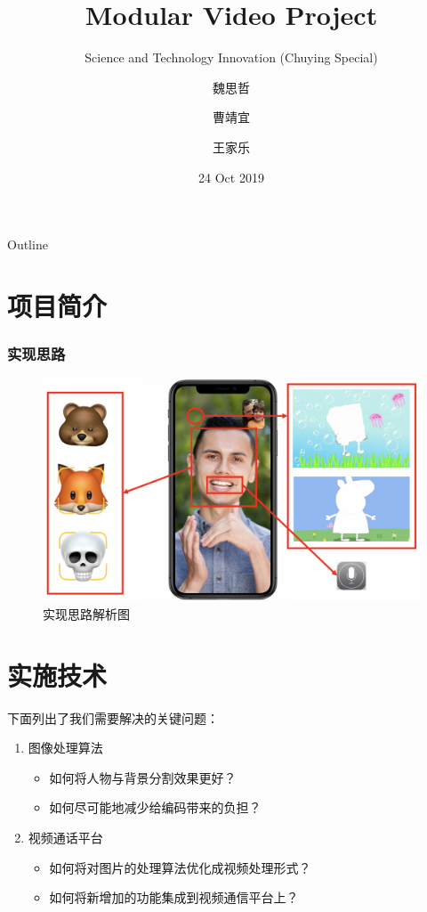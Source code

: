 \documentclass[xcolor=dvipsnames]{beamer}
\title{Modular Video Project}
\subtitle{Science and Technology Innovation (Chuying Special)}
\author[03小组]
{魏思哲\and 曹靖宜\and 王家乐}
\institute[SJTU] %
{
  Department of Electronic Engineering\\
  Shanghai Jiao Tong University
}
\date{24 Oct 2019}
\begin{document}
\begin{frame}
  \titlepage
\end{frame}


\begin{frame}{Outline}
  \tableofcontents
\end{frame}

\section{项目简介}
\begin{frame}
  \frametitle{实现思路}
  \begin{figure}
    \centering
    \includegraphics[scale=0.4]{images/intro.png}
    \caption{实现思路解析图}
    \label{}
  \end{figure}
\end{frame}

\section{实施技术}
\begin{frame}
  下面列出了我们需要解决的关键问题：
  \begin{enumerate}
    \item 图像处理算法
    \begin{itemize}
      \item 如何将人物与背景分割效果更好？
      \item 如何尽可能地减少给编码带来的负担？
    \end{itemize}
    \item 视频通话平台
    \begin{itemize}
      \item 如何将对图片的处理算法优化成视频处理形式？
      \item 如何将新增加的功能集成到视频通信平台上？
    \end{itemize}
  \end{enumerate}
\end{frame}
\end{document}
